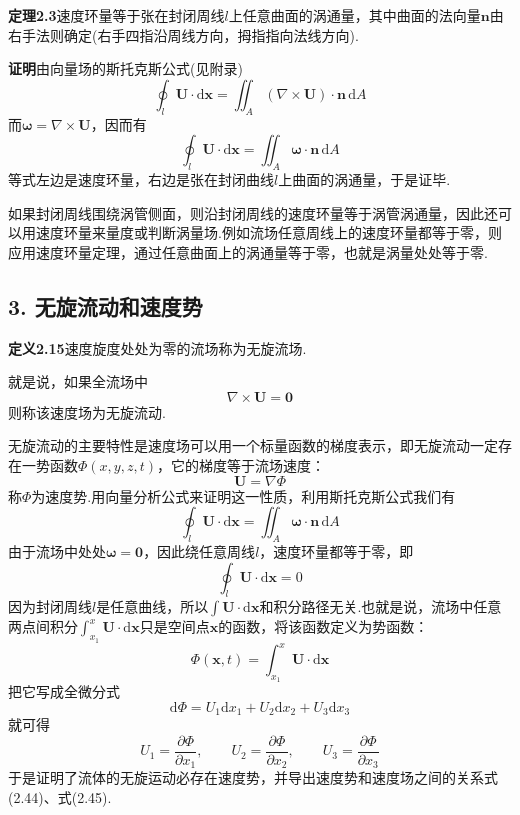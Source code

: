 \noindent\textbf{定理2.3}\quad 速度环量等于张在封闭周线$l$上任意曲面的涡通量，其中曲面的法向量$\boldsymbol{n}$由右手法则确定(右手四指沿周线方向，拇指指向法线方向).

\noindent\textbf{证明}\quad 由向量场的斯托克斯公式(见附录)
\[
\oint_l\boldsymbol{U}\cdot\mathrm{d}\boldsymbol{x}=\iint_A(\nabla\times\boldsymbol{U})\cdot\boldsymbol{n}\,\mathrm{d}A
\]
而$\boldsymbol{\omega}=\nabla\times\boldsymbol{U}$，因而有
\begin{equation*}
\oint_l\boldsymbol{U}\cdot\mathrm{d}\boldsymbol{x}=\iint_A \boldsymbol{\omega}\cdot\boldsymbol{n}\,\mathrm{d}A
\tag{2.43}
\end{equation*}
等式左边是速度环量，右边是张在封闭曲线$l$上曲面的涡通量，于是证毕.

如果封闭周线围绕涡管侧面，则沿封闭周线的速度环量等于涡管涡通量，因此还可以用速度环量来量度或判断涡量场.例如流场任意周线上的速度环量都等于零，则应用速度环量定理，通过任意曲面上的涡通量等于零，也就是涡量处处等于零.

\subsection*{3. 无旋流动和速度势}

\noindent\textbf{定义2.15}\quad 速度旋度处处为零的流场称为无旋流场.

就是说，如果全流场中
\[
\nabla\times\boldsymbol{U}=\boldsymbol{0}
\]
则称该速度场为无旋流动.

无旋流动的主要特性是速度场可以用一个标量函数的梯度表示，即无旋流动一定存在一势函数$\Phi(x,y,z,t)$，它的梯度等于流场速度：
\begin{equation*}
\boldsymbol{U}=\nabla\Phi
\tag{2.44}
\end{equation*}
称$\Phi$为速度势.用向量分析公式来证明这一性质，利用斯托克斯公式我们有
\[
\oint_l\boldsymbol{U}\cdot\mathrm{d}\boldsymbol{x}=\iint_A \boldsymbol{\omega}\cdot\boldsymbol{n}\,\mathrm{d}A
\]
由于流场中处处$\boldsymbol{\omega}=\boldsymbol{0}$，因此绕任意周线$l$，速度环量都等于零，即
\[
\oint_l\boldsymbol{U}\cdot\mathrm{d}\boldsymbol{x}=0
\]
因为封闭周线$l$是任意曲线，所以$\displaystyle\int\boldsymbol{U}\cdot\mathrm{d}\boldsymbol{x}$和积分路径无关.也就是说，流场中任意两点间积分$\displaystyle\int_{x_1}^{x}\boldsymbol{U}\cdot\mathrm{d}\boldsymbol{x}$只是空间点$\boldsymbol{x}$的函数，将该函数定义为势函数：
\begin{equation*}
\Phi(\boldsymbol{x},t)=\int_{x_1}^{x}\boldsymbol{U}\cdot\mathrm{d}\boldsymbol{x}
\tag{2.45}
\end{equation*}
把它写成全微分式
\[
\mathrm{d}\Phi=U_1\mathrm{d}x_1+U_2\mathrm{d}x_2+U_3\mathrm{d}x_3
\]
就可得
\[
U_1=\frac{\partial\Phi}{\partial x_1},\qquad U_2=\frac{\partial\Phi}{\partial x_2},\qquad U_3=\frac{\partial\Phi}{\partial x_3}
\]
于是证明了流体的无旋运动必存在速度势，并导出速度势和速度场之间的关系式(2.44)、式(2.45).

